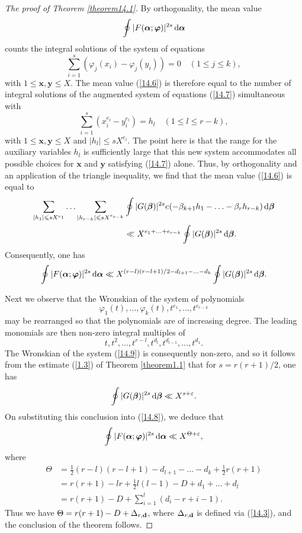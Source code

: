\documentclass[12pt,reqno]{amsart}
\theoremstyle{definition}
\theoremstyle{remark}
\numberwithin{equation}{section}
\def\bfd{{\mathbf d}} \def\bfe{{\mathbf e}} \def\bff{{\mathbf f}}
\def\bfx{{\mathbf x}}
\def\bfy{{\mathbf y}}
\def\bet{{\beta}}  \def\bfbet{{\boldsymbol \beta}}
\def\Tet{{\Theta}} \def\bfTet{{\boldsymbol \Tet}}
\def\eps{\varepsilon}
\def\le{\leqslant} \def\ge{\geqslant} \def\pleq{\preccurlyeq} \def\ple{\prec}
\def\d{{\,{\rm d}}}
\begin{document}
\begin{proof}[The proof of Theorem \ref{theorem14.1}]
By orthogonality, the mean value
\begin{equation}\label{14.6}
\oint |F(\bfalp;\bfvarphi)|^{2s}\d\bfalp 
\end{equation}
counts the integral solutions of the system of equations
\begin{equation}\label{14.7}
\sum_{i=1}^s(\varphi_j(x_i)-\varphi_j(y_i))=0\quad (1\le j\le k),
\end{equation}
with $1\le \bfx,\bfy\le X$. The mean value (\ref{14.6}) is therefore equal to the number of 
integral solutions of the augmented system of equations (\ref{14.7}) simultaneous with
$$\sum_{i=1}^s(x_i^{e_l}-y_i^{e_l})=h_l\quad (1\le l\le r-k),$$
with $1\le \bfx,\bfy\le X$ and $|h_l|\le sX^{e_l}$. The point here is that the range for the 
auxiliary variables $h_l$ is sufficiently large that this new system accommodates all possible 
choices for $\bfx$ and $\bfy$ satisfying (\ref{14.7}) alone. Thus, by orthogonality and an 
application of the triangle inequality, we find that the mean value (\ref{14.6}) is equal to
\begin{align*}
\sum_{|h_1|\le sX^{e_1}}\ldots \sum_{|h_{r-k}|\le sX^{e_{r-k}}}&
\oint |G(\bfbet)|^{2s}e(-\bet_{k+1}h_1-\ldots -\bet_rh_{r-k})\d\bfbet \\
&\ll X^{e_1+\ldots +e_{r-k}}\oint |G(\bfbet)|^{2s}\d\bfbet .
\end{align*}
Consequently, one has
\begin{equation}\label{14.8}
\oint |F(\bfalp;\bfvarphi)|^{2s}\d\bfalp \ll X^{(r-l)(r-l+1)/2-d_{l+1}-\ldots -d_k}\oint 
|G(\bfbet)|^{2s}\d\bfbet .
\end{equation}

\par Next we observe that the Wronskian of the system of polynomials
\begin{equation}\label{14.9}
\varphi_1(t),\ldots ,\varphi_k(t),t^{e_1},\ldots ,t^{e_{r-k}}
\end{equation}
may be rearranged so that the polynomials are of increasing degree. The leading monomials 
are then non-zero integral multiples of
$$t,t^2,\ldots ,t^{r-l},t^{d_l},t^{d_{l-1}},\ldots,t^{d_1}.$$
The Wronskian of the system (\ref{14.9}) is consequently non-zero, and so it follows from 
the estimate (\ref{1.3}) of Theorem \ref{theorem1.1} that for $s=r(r+1)/2$, one has
$$\oint |G(\bfbet)|^{2s}\d\bfbet \ll X^{s+\eps}.$$
On substituting this conclusion into (\ref{14.8}), we deduce that
$$\oint |F(\bfalp;\bfvarphi)|^{2s}\d\bfalp \ll X^{\Tet+\eps},$$
where
\begin{align*}
\Tet &=\tfrac{1}{2}(r-l)(r-l+1)-d_{l+1}-\ldots -d_k+\tfrac{1}{2}r(r+1)\\
&=r(r+1)-lr+\tfrac{1}{2}l(l-1)-D+d_1+\ldots +d_l\\
&=r(r+1)-D+\sum_{i=1}^l(d_i-r+i-1).
\end{align*}
Thus we have $\Tet=r(r+1)-D+\Del_{r,\bfd}$, where $\Del_{r,\bfd}$ is defined via 
(\ref{14.3}), and the conclusion of the theorem follows.
\end{proof}
\end{document}
